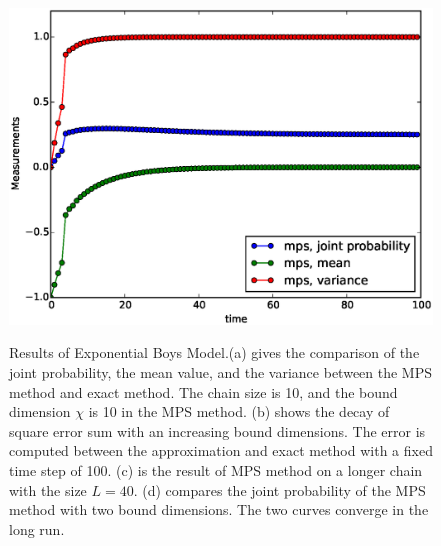 \documentclass[english]{article}
\begin{document}
\begin{figure}[htbp]
{\includegraphics[scale=0.4]{Result_Fig/Exponential_MPS_t100_s40_bd10.eps}}\hfill
{}
  \caption{Results of Exponential Boys Model.(a) gives the comparison of the joint probability, the mean value, and the variance between the MPS method and exact method. The chain size is 10, and the bound dimension $\chi$ is 10 in the MPS method. (b) shows the decay of square error sum with an increasing bound dimensions. The error is computed between the approximation and exact method with a fixed time step of 100. (c) is the result of MPS method on a longer chain with the size $L=40$. (d) compares the joint probability of the MPS method with two bound dimensions. The two curves converge in the long run.}
  \label{fig:Exponential_result}
\end{figure}
\end{document}
